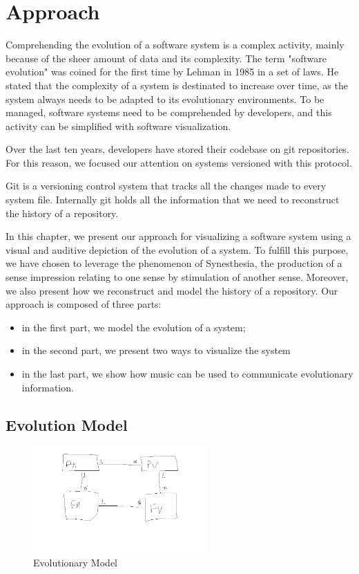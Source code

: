 
\chapter[Approach]{Approach}
\graphicspath{ {images/approach} }

Comprehending the evolution of a software system is a complex activity, mainly because of the sheer amount of data and its complexity. 
The term "software evolution" was coined for the first time by Lehman in 1985 in a set of laws. \cite{Lehman1985}
He stated that the complexity of a system is destinated to increase over time, as the system always needs to be adapted to its evolutionary environments. 
To be managed, software systems need to be comprehended by developers, and this activity can be simplified with software visualization. 

Over the last ten years, developers have stored their codebase on git repositories. 
For this reason, we focused our attention on systems versioned with this protocol.

Git is a versioning control system that tracks all the changes made to every system file. 
Internally git holds all the information that we need to reconstruct the history of a repository. 

In this chapter, we present our approach for visualizing a software system using a visual and auditive depiction of the evolution of a system. 
To fulfill this purpose, we have chosen to leverage the phenomenon of Synesthesia, the production of a sense impression relating to one sense by stimulation of another sense.
Moreover, we also present how we reconstruct and model the history of a repository. 
\bigbreak
Our approach is composed of three parts: \begin{itemize}
\item in the first part, we model the evolution of a system; 
\item in the second part, we present two ways to visualize the system 
\item in the last part, we show how music can be used to communicate evolutionary information. 
\end{itemize}


\section{Evolution Model}
\label{s:EvolutionModel}

\begin{figure}[H]
    \includegraphics[width=0.6\textwidth]{EvolutionaryModel.jpg}
    \caption{Evolutionary Model}
    \label{fig:EvolutionaryModel1}
\end{figure}

